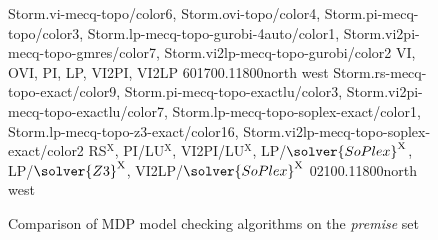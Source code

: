 
\begin{figure*}[t]
	\centering
	{Storm.vi-mecq-topo/color6, Storm.ovi-topo/color4, Storm.pi-mecq-topo/color3, Storm.lp-mecq-topo-gurobi-4auto/color1, Storm.vi2pi-mecq-topo-gmres/color7, Storm.vi2lp-mecq-topo-gurobi/color2}
	{VI, OVI, PI, LP, VI2PI, VI2LP}
	{60}{170}{0.1}{1800}{north west}%
	{Storm.rs-mecq-topo-exact/color9, Storm.pi-mecq-topo-exactlu/color3, Storm.vi2pi-mecq-topo-exactlu/color7, Storm.lp-mecq-topo-soplex-exact/color1, Storm.lp-mecq-topo-z3-exact/color16, Storm.vi2lp-mecq-topo-soplex-exact/color2}
	{RS$^\mathrm{X}$, PI/LU$^\mathrm{X}$, VI2PI/LU$^\mathrm{X}$, LP/$\solver{SoPlex}^\mathrm{X}$, LP/$\solver{Z3}^\mathrm{X}$, VI2LP/$\solver{SoPlex}^\mathrm{X}$}
	{0}{210}{0.1}{1800}{north west}
	\caption{Comparison of MDP model checking algorithms on the \textit{premise} set}
	\label{fig:MethodsPremise}
\end{figure*}